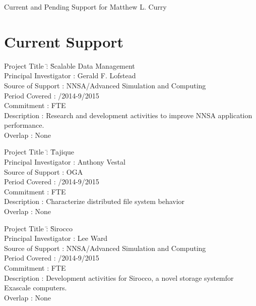 \documentclass[10pt]{article}
\begin{document}
\begin{center}
{\Large Current and Pending Support for Matthew L. Curry}
\end{center}

\section*{Current Support}

\begin{tabbing}
Project Title \hspace{5.5em}\=: \= Scalable Data Management\\
Principal Investigator      \>: \> Gerald F. Lofstead\\
Source of Support           \>: \> NNSA/Advanced Simulation and Computing\\
Period Covered              \>: /2014-9/2015\\
Commitment                  \>:  FTE\\
Description                 \>: \> Research and development activities to improve NNSA application performance.\\
Overlap                     \>: \> None\\
\end{tabbing}

\begin{tabbing}
Project Title \hspace{5.5em}\=: \= Tajique\\
Principal Investigator      \>: \> Anthony Vestal\\
Source of Support           \>: \> OGA\\
Period Covered              \>: /2014-9/2015\\
Commitment                  \>:  FTE\\
Description                 \>: \> Characterize distributed file system behavior\\
Overlap                     \>: \> None\\
\end{tabbing}

\begin{tabbing}
Project Title \hspace{5.5em}\=: \= Sirocco\\
Principal Investigator      \>: \> Lee Ward\\
Source of Support           \>: \> NNSA/Advanced Simulation and Computing\\
Period Covered              \>: /2014-9/2015\\
Commitment                  \>:  FTE\\
Description                 \>: \> Development activities for Sirocco, a novel storage systemfor Exascale computers.\\
Overlap                     \>: \> None\\
\end{tabbing}
\end{document}
